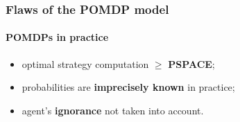 \documentclass[12pt,svgnames,table]{beamer}
\begin{document}
\begin{frame}
\frametitle{Flaws of the POMDP model}
\framesubtitle{\footnotesize POMDPs in practice}
\begin{itemize}
\item optimal strategy computation $\geqslant$ \textbf{PSPACE};
\end{itemize}
\begin{itemize}
\item probabilities are \textbf{imprecisely known} in practice;
\end{itemize}
\begin{itemize}
\item agent's \textbf{ignorance} not taken into account.
\end{itemize}
\end{frame}
\end{document}
